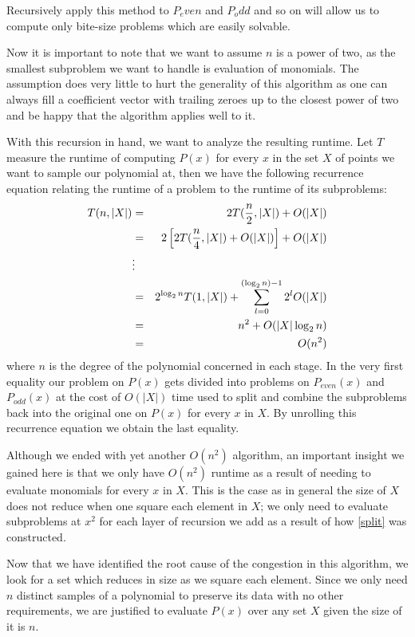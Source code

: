 \documentclass[../article.tex]{subfiles}
\begin{document}
Recursively apply this method to $P_even$ and $P_odd$ and so on will allow us to compute only bite-size problems which are easily solvable.

Now it is important to note that we want to assume $n$ is a power of two, as the smallest subproblem we want to handle is evaluation of monomials. The assumption does very little to hurt the generality of this algorithm as one can always fill a coefficient vector with trailing zeroes up to the closest power of two and be happy that the algorithm applies well to it.

With this recursion in hand, we want to analyze the resulting runtime. Let $T$ measure the runtime of computing $P(x)$ for every $x$ in the set $X$ of points we want to sample our polynomial at, then we have the following recurrence equation relating the runtime of a problem to the runtime of its subproblems:
\begin{eqnarray}
	T(n,|X|) &=& 2T(\frac{n}{2}, |X|) + O(|X|)\notag\\
	&=& 2\left[2T(\frac{n}{4}, |X|)+O(|X|)\right]+O(|X|)\notag\\
	&\vdots&\notag\\
	&=& 2^{\log_2{n}}T(1,|X|)+\sum_{l=0}^{(\log_2{n})-1}2^lO(|X|) \label{recurrence}\\
	&=& n^2+O(|X|\log_2{n})\notag\\
	&=& O(n^2)\notag
\end{eqnarray}
where $n$ is the degree of the polynomial concerned in each stage. In the very first equality our problem on $P(x)$ gets divided into problems on $P_{even}(x)$ and $P_{odd}(x)$ at the cost of $O(|X|)$ time used to split and combine the subproblems back into the original one on $P(x)$ for every $x$ in $X$. By unrolling this recurrence equation we obtain the last equality.

Although we ended with yet another $O(n^2)$ algorithm, an important insight we gained here is that we only have $O(n^2)$ runtime as a result of needing to evaluate monomials for every $x$ in $X$. This is the case as in general the size of $X$ does not reduce when one square each element in $X$; we only need to evaluate subproblems at $x^2$ for each layer of recursion we add as a result of how \eqref{split} was constructed.

Now that we have identified the root cause of the congestion in this algorithm, we look for a set which reduces in size as we square each element. Since we only need $n$ distinct samples of a polynomial to preserve its data with no other requirements, we are justified to evaluate $P(x)$ over any set $X$ given the size of it is $n$.
\end{document}
